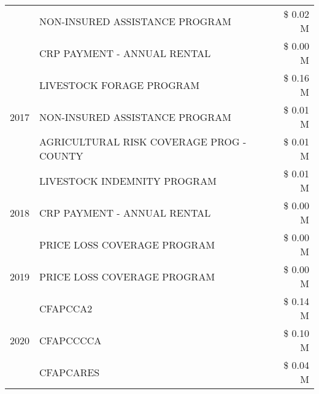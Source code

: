 \begin{tabular}{llr}
 & NON-INSURED ASSISTANCE PROGRAM                & \$ 0.02 M \\
 & CRP PAYMENT - ANNUAL RENTAL                   & \$ 0.00 M \\
\cline{1-3}
\multirow[t]{3}{*}{2017} & LIVESTOCK FORAGE PROGRAM & \$ 0.16 M \\
 & NON-INSURED ASSISTANCE PROGRAM & \$ 0.01 M \\
 & AGRICULTURAL RISK COVERAGE PROG - COUNTY & \$ 0.01 M \\
\cline{1-3}
\multirow[t]{3}{*}{2018} & LIVESTOCK INDEMNITY PROGRAM & \$ 0.01 M \\
 & CRP PAYMENT - ANNUAL RENTAL & \$ 0.00 M \\
 & PRICE LOSS COVERAGE PROGRAM & \$ 0.00 M \\
\cline{1-3}
2019 & PRICE LOSS COVERAGE PROGRAM & \$ 0.00 M \\
\cline{1-3}
\multirow[t]{3}{*}{2020} & CFAPCCA2 & \$ 0.14 M \\
 & CFAPCCCCA & \$ 0.10 M \\
 & CFAPCARES & \$ 0.04 M \\
\cline{1-3}
\bottomrule
\end{tabular}
